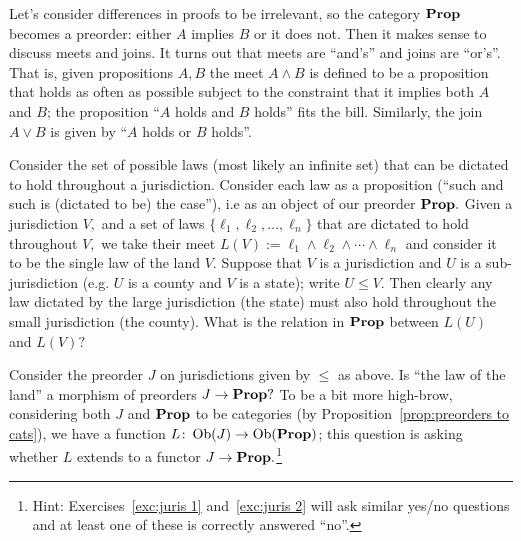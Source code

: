 \documentclass[../main/CT4S-EN-RU]{subfiles}
\begin{document}
\begin{exampleRUS}
\end{exampleRUS}

\begin{blockENG}
Let's consider differences in proofs to be irrelevant, so the category ${\mathbf{Prop}}$ becomes a preorder: either $A$ implies $B$ or it does not. Then it makes sense to discuss meets and joins. It turns out that meets are “and's” and joins are “or's”. That is, given propositions $A,B$ the meet $A\wedge B$ is defined to be a proposition that holds as often as possible subject to the constraint that it implies both $A$ and $B$; the proposition “$A$ holds and $B$ holds” fits the bill. Similarly, the join $A\vee B$ is given by “$A$ holds or $B$ holds”.
\end{blockENG}

\begin{blockRUS}
\end{blockRUS}

\begin{exerciseENG}\label{exc:juris 1}
Consider the set of possible laws (most likely an infinite set) that can be dictated to hold throughout a jurisdiction. Consider each law as a proposition (“such and such is (dictated to be) the case”), i.e as an object of our preorder ${\mathbf{Prop}}.$ Given a jurisdiction $V,$ and a set of laws $\{\ell_1,\ell_2,\ldots,\ell_n\}$ that are dictated to hold throughout $V,$ we take their meet $L(V):=\ell_1\wedge\ell_2\wedge\cdots\wedge\ell_n$ and consider it to be the single law of the land $V.$ Suppose that $V$ is a jurisdiction and $U$ is a sub-jurisdiction (e.g. $U$ is a county and $V$ is a state); write $U\leq V.$ Then clearly any law dictated by the large jurisdiction (the state) must also hold throughout the small jurisdiction (the county).
\sexc What is the relation in ${\mathbf{Prop}}$ between $L(U)$ and $L(V)?$
\item Consider the preorder $J$ on jurisdictions given by $\leq$ as above. Is “the law of the land” a morphism of preorders $J\rightarrow{\mathbf{Prop}}?$ To be a bit more high-brow, considering both $J$ and ${\mathbf{Prop}}$ to be categories (by Proposition~\ref{prop:preorders to cats}), we have a function $L\colon\operatorname{Ob}(J)\rightarrow\operatorname{Ob}({\mathbf{Prop}})$; this question is asking whether $L$ extends to a functor $J\rightarrow{\mathbf{Prop}}.$\footnote{Hint: Exercises~\ref{exc:juris 1} and~\ref{exc:juris 2} will ask similar yes/no questions and at least one of these is correctly answered “no”.}
\endsexc
\end{exerciseENG}

\begin{exerciseRUS}\label{exc:juris 1}
\end{exerciseRUS}
\end{document}
